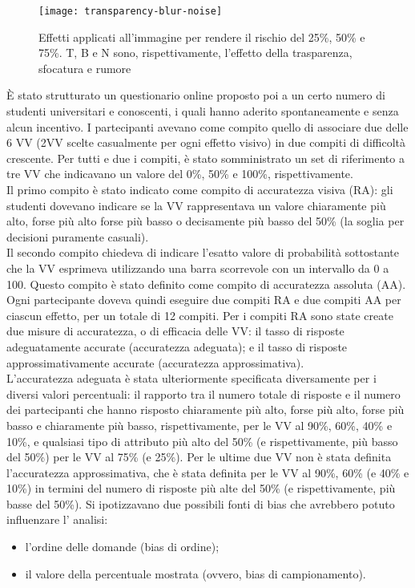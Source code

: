 \begin{figure}[!ht] 
    \centering 
    \texttt{[image: transparency-blur-noise]} 
    \caption{Effetti applicati all'immagine per rendere il rischio del 25\%, 50\% e 75\%. T, B e N sono, rispettivamente, l'effetto della trasparenza, sfocatura e rumore}
\end{figure}

È stato strutturato un questionario online proposto poi a un certo numero di studenti universitari e conoscenti, i quali hanno aderito spontaneamente e senza alcun incentivo. I partecipanti avevano come compito quello di associare due delle 6 VV (2VV scelte casualmente per ogni effetto visivo) in due compiti di difficoltà crescente. Per tutti e due i compiti, è stato somministrato un set di riferimento a tre VV che indicavano un valore del 0\%, 50\% e 100\%, rispettivamente.\\
Il primo compito è stato indicato come compito di accuratezza visiva (RA): gli studenti dovevano indicare se la VV rappresentava un valore chiaramente più alto, forse più alto forse più basso o decisamente più basso del 50\% (la soglia per decisioni puramente casuali).\\
Il secondo compito chiedeva di indicare l'esatto valore di probabilità sottostante che la VV esprimeva utilizzando una barra scorrevole con un intervallo da 0 a 100. Questo compito è stato definito come compito di accuratezza assoluta (AA).\\
Ogni partecipante doveva quindi eseguire due compiti RA e due compiti AA per ciascun effetto, per un totale di 12 compiti. Per i compiti RA sono state create due misure di accuratezza, o di efficacia delle VV: il tasso di risposte adeguatamente accurate (accuratezza adeguata); e il tasso di risposte approssimativamente accurate (accuratezza approssimativa).\\
L'accuratezza adeguata è stata ulteriormente specificata diversamente per i diversi valori percentuali: il rapporto tra il numero totale di risposte e il numero dei partecipanti che hanno risposto chiaramente più alto, forse più alto, forse più basso e chiaramente più basso, rispettivamente, per le VV al 90\%, 60\%, 40\% e 10\%, e qualsiasi tipo di attributo più alto del 50\% (e rispettivamente, più basso del 50\%) per le VV al 75\% (e 25\%).
Per le ultime due VV non è stata definita l'accuratezza approssimativa, che è stata definita per le VV al 90\%, 60\% (e 40\% e 10\%) in termini del numero di risposte più alte del 50\% (e rispettivamente, più basse del 50\%).
Si ipotizzavano due possibili fonti di bias che avrebbero potuto influenzare l' analisi:
\begin{itemize}
\item l'ordine delle domande (bias di ordine);
\item il valore della percentuale mostrata (ovvero, bias di campionamento).
\end{itemize}

